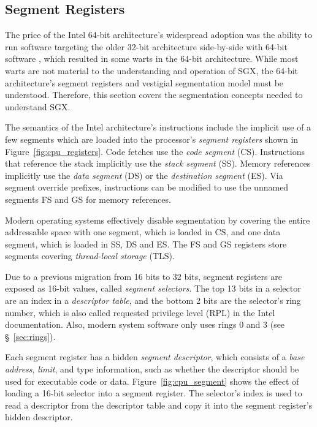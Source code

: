 \subsection{Segment Registers}
\label{sec:segments}

The price of the Intel 64-bit architecture's widespread adoption was the
ability to run software targeting the older 32-bit architecture side-by-side
with 64-bit software \cite{cnet2005itanium}, which resulted in some warts in
the 64-bit architecture. While most warts are not material to the understanding
and operation of SGX, the 64-bit architecture's segment registers and vestigial
segmentation model must be understood. Therefore, this section covers the
segmentation concepts needed to understand SGX.

The semantics of the Intel architecture's instructions include the implicit use
of a few segments which are loaded into the processor's
\textit{segment registers} shown in Figure~\ref{fig:cpu_registers}. Code
fetches use the \textit{code segment} (CS).  Instructions that reference the
stack implicitly use the \textit{stack segment} (SS). Memory references
implicitly use the \textit{data segment} (DS) or the \textit{destination
segment} (ES). Via segment override prefixes, instructions can be modified to
use the unnamed segments FS and GS for memory references.

Modern operating systems effectively disable segmentation by covering the
entire addressable space with one segment, which is loaded in CS, and one data
segment, which is loaded in SS, DS and ES. The FS and GS registers store
segments covering \textit{thread-local storage} (TLS).


Due to a previous migration from 16 bits to 32 bits, segment registers are
exposed as 16-bit values, called \textit{segment selectors}. The top 13 bits in
a selector are an index in a \textit{descriptor table}, and the bottom 2 bits
are the selector's ring number, which is also called requested privilege level
(RPL) in the Intel documentation. Also, modern system software only uses rings
0 and 3 (see \S~\ref{sec:rings}).


Each segment register has a hidden \textit{segment descriptor}, which consists
of a \textit{base address}, \textit{limit}, and type information, such as
whether the descriptor should be used for executable code or data.
Figure~\ref{fig:cpu_segment} shows the effect of loading a 16-bit selector into
a segment register. The selector's index is used to read a descriptor from the
descriptor table and copy it into the segment register's hidden descriptor.


